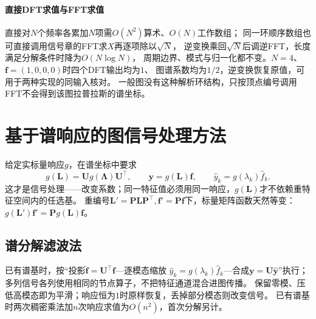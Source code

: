 \paragraph{直接DFT求值与FFT求值}
直接对$N$个频率各累加$N$项需$O(N^2)$算术、$O(N)$工作数组；
同一环顺序数组也可直接调用信号章的FFT求$X$再逐项除以$\sqrt N$，
逆变换乘回$\sqrt N$后调逆FFT，长度满足分解条件时降为$O(N\log N)$，
周期边界、模式与归一化都不变。$N=4$、$\bm f=(1,0,0,0)$时四个DFT输出均为$1$、
图谱系数均为$1/2$，逆变换恢复原值，可用于两种实现的同输入核对。
一般图没有这种解析环结构，只按顶点编号调用FFT不会得到该图拉普拉斯的谱坐标。

\section{基于谱响应的图信号处理方法}

给定实标量响应$g$，在谱坐标中要求
\[
  g(\bm L)=\bm U g(\bm\Lambda)\bm U^\top,\qquad
  \bm y=g(\bm L)\bm f,\qquad \widehat y_k=g(\lambda_k)\widehat f_k.
\]
这才是信号处理——改变系数；同一特征值必须用同一响应，$g(\bm L)$才不依赖重特征空间内的任选基。
重编号$\bm L'=\bm P\bm L\bm P^\top,\bm f'=\bm P\bm f$下，标量矩阵函数天然等变：$g(\bm L')\bm f'=\bm P g(\bm L)\bm f$。

\subsection{谱分解滤波法}
已有谱基时，按“投影$\widehat{\bm f}=\bm U^\top\bm f$—逐模态缩放
$\widehat y_k=g(\lambda_k)\widehat f_k$—合成$\bm y=\bm U\widehat{\bm y}$”执行；
多列信号各列使用相同的节点算子，不把特征通道混合进图传播。
保留零模、压低高模态即为平滑；响应恒为$1$时原样恢复，丢掉部分模态则改变信号。
已有谱基时两次稠密乘法加$n$次响应求值为$O(n^2)$，首次分解另计。


